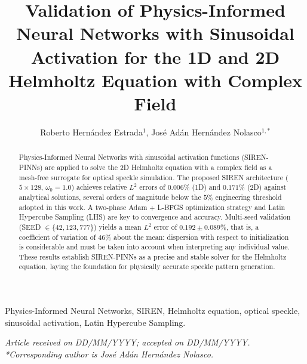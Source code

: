 \documentclass{cys}
\title{Validation of Physics-Informed Neural Networks with Sinusoidal
       Activation for the 1D and 2D Helmholtz Equation with Complex Field}
\author{Roberto Hernández Estrada$^1$, José Adán Hernández Nolasco$^{1,*}$}
\affil{
$^1$ Universidad Juárez Autónoma de Tabasco, División Académica de Ciencias Básicas,
Cunduacán, \authorcr
Mexico \authorcr \authorcr
robertohernandezestrd@gmail.com, jose.hernandez@ujat.mx \authorcr \authorcr
}
\begin{document}
\maketitle
\renewcommand{\tablename}{Table}

\begin{abstract}
Physics-Informed Neural Networks with sinusoidal activation functions (SIREN-PINNs)
are applied to solve the 2D Helmholtz equation with a complex field as a mesh-free
surrogate for optical speckle simulation.
The proposed SIREN architecture ($5 \times 128$, $\omega_0 = 1.0$) achieves relative
$L^2$ errors of $0.006\%$ (1D) and $0.171\%$ (2D) against analytical solutions,
several orders of magnitude below the $5\%$ engineering threshold adopted in this
work.
A two-phase Adam + L-BFGS optimization strategy and Latin Hypercube Sampling (LHS)
are key to convergence and accuracy.
Multi-seed validation (SEED $\in \{42, 123, 777\}$) yields a mean $L^2$ error of
$0.192 \pm 0.089\%$, that is, a coefficient of variation of $46\%$ about the
mean: dispersion with respect to initialization is considerable and must be
taken into account when interpreting any individual value.
These results establish SIREN-PINNs as a precise and stable solver for the Helmholtz
equation, laying the foundation for physically accurate speckle pattern generation.
\end{abstract}

\begin{keywords}
Physics-Informed Neural Networks, SIREN, Helmholtz equation, optical speckle,
sinusoidal activation, Latin Hypercube Sampling.
\end{keywords}







{


}

{\vskip 12pt}
\noindent
\footnotesize {\textit{Article received on DD/MM/YYYY; accepted on DD/MM/YYYY.\\
{*}Corresponding author is José Adán Hernández Nolasco.}}
\end{document}
